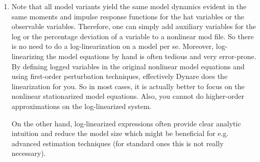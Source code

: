 \begin{enumerate}
\item Note that all model variants yield the same model dynamics evident in the same moments and impulse response functions for the hat variables or the observable variables.
Therefore, one can simply add auxiliary variables for the log or the percentage deviation of a variable to a nonlinear mod file.
So there is no need to do a log-linearization on a model per se.
Moreover, log-linearizing the model equations by hand is often tedious and very error-prone.
By defining logged variables in the original nonlinear model equations and using first-order perturbation techniques,
  effectively Dynare does the linearization for you.
So in most cases, it is actually better to focus on the nonlinear stationarized model equations.
Also, you cannot do higher-order approximations on the log-linearized system.

On the other hand, log-linearized expressions often provide clear analytic intuition
  and reduce the model size which might be beneficial for e.g. advanced estimation techniques
  (for standard ones this is not really necessary).
\end{enumerate}